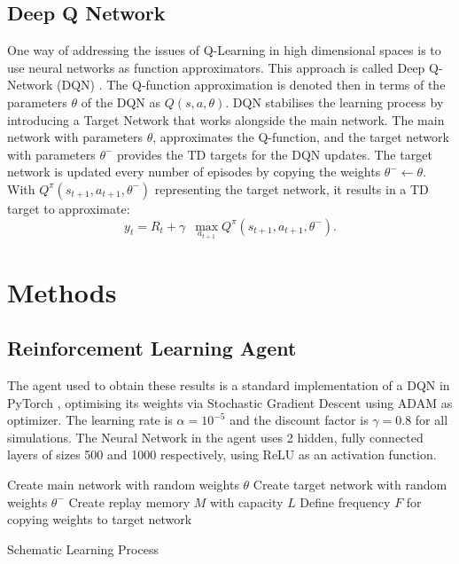 \documentclass[conference]{IEEEtran}
\begin{document}
\subsection{Deep Q Network}
One way of addressing the issues of Q-Learning in high dimensional spaces is to use neural networks as function approximators. This approach is called Deep Q-Network (DQN) \cite{mnih2015}.
The Q-function approximation is denoted then in terms of the parameters $\theta$ of the DQN as $Q(s,a,\theta)$.
DQN stabilises the learning process by introducing a Target Network that works alongside the main network. 
The main network with parameters $\theta$, approximates the Q-function, and the target network with parameters $\theta^-$  provides the TD targets for the DQN updates. 
The target network is updated every number of episodes by copying the weights $\theta^- \leftarrow \theta$. With $Q^{\pi} (s_{t+1}, a_{t+1}, \theta^-)$ representing the target network, it results in a TD target to approximate:
\begin{equation}
y_t = R_t + \gamma \,\,\, \max_{a_{t+1}} Q^{\pi} (s_{t+1}, a_{t+1}, \theta^-).
\end{equation}
\section{Methods}
\label{methods}
\subsection{Reinforcement Learning Agent}
The agent used to obtain these results is a standard implementation of a DQN in PyTorch \cite{pytorch}, optimising its weights via Stochastic Gradient Descent \cite{kiefer} using ADAM \cite{adam} as optimizer.
The learning rate is $\alpha=10^{-5}$ and the discount factor is $\gamma = 0.8$ for all simulations.
The Neural Network in the agent uses 2 hidden, fully connected layers of sizes 500 and 1000 respectively, using ReLU as an activation function.
\begin{algorithm}
\SetAlgoLined
 Create main network with random weights $\theta$\;
 Create target network with random weights $\theta^-$\;
 Create replay memory $M$ with capacity $L$\;
 Define frequency $F$ for copying weights to target network\;
 \caption{Schematic Learning Process}

\end{algorithm}
\end{document}
